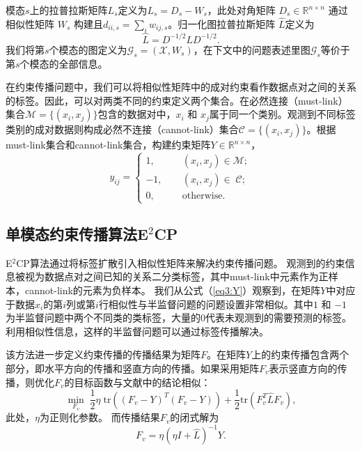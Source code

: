 模态$s$上的拉普拉斯矩阵$ {L}_s $定义为$ {L}_s={D}_s-{W}_s $，此处对角矩阵
$ {D}_s \in \mathbb{R}^{n\times n}$ 通过相似性矩阵 $ {W}_s$ 构建且$ d_{ii,s} =\sum_i w_{ij,s}$\cite{chung1997spectral}。归一化图拉普拉斯矩阵 $ \hat{{L}} $定义为
\begin{equation}
	\hat{{L}} = {D}^{-1/2}{LD}^{-1/2}.
\end{equation}
我们将第$s$个模态的图定义为$\mathcal{G}_s = (\mathcal{X},{W}_s)$，在下文中的问题表述里图$\mathcal{G}_s$等价于第$s$个模态的全部信息。

在约束传播问题中，我们可以将相似性矩阵中的成对约束看作数据点对之间的关系的标签。因此，可以对两类不同的约束定义两个集合。在必然连接（must-link）集合$ \mathcal{M} = \{(x_i,x_j)\} $包含的数据对中，$ x_i $ 和 $ x_j $属于同一个类别。观测到不同标签类别的成对数据则构成必然不连接（cannot-link）集合$ \mathcal{C} = \{(x_i,x_j)\}$。根据must-link集合和cannot-link集合，构建约束矩阵$ {Y} \in  \mathbb{R}^{n\times n}$，
\begin{equation}
y_{ij} = 
\begin{cases}
1, \qquad&(x_i,x_j)\in \mathcal{M};\\
-1, &(x_i,x_j)\in\; \mathcal{C};\\
0, &\text{otherwise}.
\end{cases}
\label{eq3:Y}
\end{equation}

\subsection{单模态约束传播算法E$^2$CP}
E$^2$CP算法通过将标签扩散引入相似性矩阵来解决约束传播问题。
观测到的约束信息被视为数据点对之间已知的关系二分类标签，其中must-link中元素作为正样本，cannot-link的元素为负样本。
我们从公式（\ref{eq3:Y}）观察到，在矩阵$Y$中对应于数据$x_i$的第$i$列或第$i$行相似性与半监督问题的问题设置非常相似。其中$ 1 $ 和 $ -1 $为半监督问题中两个不同类的类标签，大量的$0$代表未观测到的需要预测的标签。利用相似性信息，这样的半监督问题可以通过标签传播\cite{zhou2004learning}解决。

该方法进一步定义约束传播的传播结果为矩阵$F$。在矩阵$Y$上的约束传播包含两个部分，即水平方向的传播和竖直方向的传播。如果采用矩阵$F_v$表示竖直方向的传播，则优化$F_v$的目标函数与文献\parencite{zhou2004learning}中的结论相似：
\begin{equation}
	\mathop{\mathrm{min}}_{{F}_v}\;\frac{1}{2}\eta\;\mathrm{tr}(({F}_v-{Y})^T({F}_v-{Y}))+\frac{1}{2}\mathrm{tr}({F}_v^T\hat{{L}}{F}_v), 
\end{equation}
此处，$ \eta $为正则化参数。
而传播结果$F_v$的闭式解为
\begin{equation}
	{F}_v = \eta(\eta{I}+\hat{{L}})^{-1}{Y}.
\end{equation}

